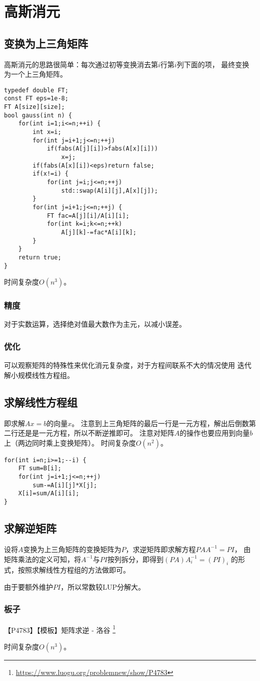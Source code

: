 \section{高斯消元}
\subsection{变换为上三角矩阵}
高斯消元的思路很简单：每次通过初等变换消去第$i$行第$i$列下面的项，
最终变换为一个上三角矩阵。
\begin{lstlisting}[title=gauss]
typedef double FT;
const FT eps=1e-8;
FT A[size][size];
bool gauss(int n) {
    for(int i=1;i<=n;++i) {
        int x=i;
        for(int j=i+1;j<=n;++j)
            if(fabs(A[j][i])>fabs(A[x][i]))
                x=j;
        if(fabs(A[x][i])<eps)return false;
        if(x!=i) {
            for(int j=i;j<=n;++j)
                std::swap(A[i][j],A[x][j]);
        }
        for(int j=i+1;j<=n;++j) {
            FT fac=A[j][i]/A[i][i];
            for(int k=i;k<=n;++k)
                A[j][k]-=fac*A[i][k];
        }
    }
    return true;
}
\end{lstlisting}
时间复杂度$O(n^3)$。
\subsubsection{精度}
对于实数运算，选择绝对值最大数作为主元，以减小误差。
\subsubsection{优化}
可以观察矩阵的特殊性来优化消元复杂度，对于方程间联系不大的情况使用
迭代解小规模线性方程组。
\subsection{求解线性方程组}\label{LSE}
即求解$Ax=b$的向量$x$。
注意到上三角矩阵的最后一行是一元方程，解出后倒数第二行还是是一元方程，所以不断逆推即可。
注意对矩阵$A$的操作也要应用到向量$b$上（两边同时乘上变换矩阵）。
时间复杂度$O(n^2)$。
\begin{lstlisting}
for(int i=n;i>=1;--i) {
    FT sum=B[i];
    for(int j=i+1;j<=n;++j)
        sum-=A[i][j]*X[j];
    X[i]=sum/A[i][i];
}
\end{lstlisting}
\subsection{求解逆矩阵}\label{InvMatGauss}
设将$A$变换为上三角矩阵的变换矩阵为$P$，求逆矩阵即求解方程$PAA^{-1}=PI$，
由矩阵乘法的定义可知，将$A^{-1}$与$PI$按列拆分，即得到$(PA)A_i^{-1}=(PI)_i$
的形式，按照求解线性方程组的方法做即可。

由于要额外维护$PI$，所以常数较LUP分解大。

\subsubsection{板子}

【P4783】【模板】矩阵求逆 - 洛谷
\footnote{\url{https://www.luogu.org/problemnew/show/P4783}}

时间复杂度$O(n^3)$。
